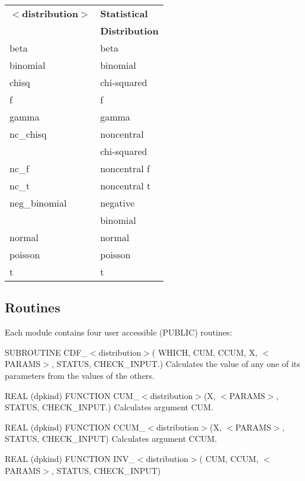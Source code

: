 \documentclass[12pt,dvips]{article}
\newcommand{\meta}[1]{{\ensuremath{<}}#1{\ensuremath{{>}}}}
\newcommand{\mysubsection}[1] {\color{green}
             \subsection{#1} \normalcolor}
\begin{document}
\begin{center}
\begin{tabular}{ll}
\hline
{\bf \meta{distribution}} & {\bf Statistical} \\
& {\bf Distribution}\\ \hline
beta & beta \\ \hline
binomial & binomial \\ \hline
chisq & chi-squared \\ \hline
f & f \\ \hline
gamma & gamma \\ \hline
nc\_chisq & noncentral \\
& chi-squared \\ \hline
nc\_f & noncentral f \\
\hline
nc\_t & noncentral t \\
\hline
neg\_binomial & negative \\
& binomial \\ \hline
normal & normal \\ \hline
poisson & poisson \\ \hline
t & t \\ \hline

\end{tabular}
\end{center}

\mysubsection{Routines}

Each module contains four user accessible (PUBLIC) routines:

\begin{description}

\item SUBROUTINE CDF\_\meta{distribution}( WHICH, CUM, CCUM, X,
\meta{PARAMS}, STATUS, CHECK\_INPUT.)
Calculates the value  of any one of its parameters  from the values of
the others.

\item    REAL   (dpkind)   FUNCTION    CUM\_\meta{distribution}(X,
\meta{PARAMS}, STATUS, CHECK\_INPUT.)  Calculates argument CUM.

\item    REAL    (dpkind) FUNCTION    CCUM\_\meta{distribution}(X,
\meta{PARAMS}, STATUS, CHECK\_INPUT) Calculates argument CCUM.

\item  REAL (dpkind) FUNCTION  INV\_\meta{distribution}(  CUM, CCUM,
\meta{PARAMS}, STATUS, CHECK\_INPUT)

\end{description}
\end{document}
